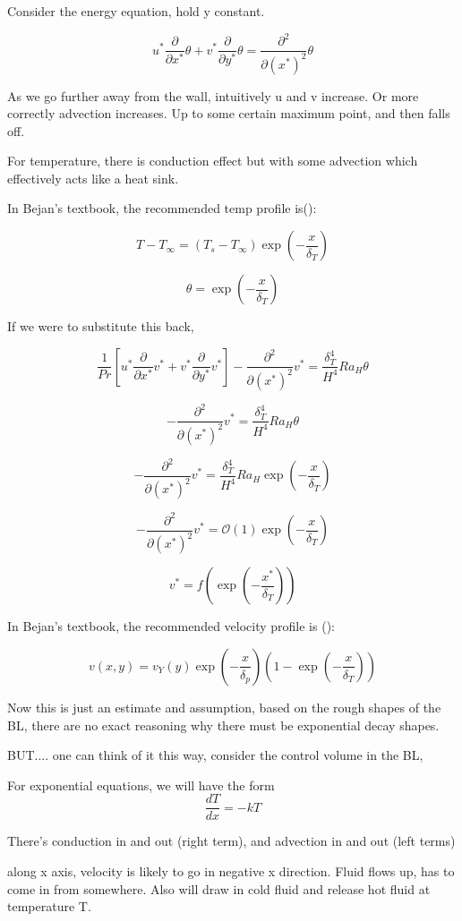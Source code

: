 \documentclass[11pt]{article}
\begin{document}
Consider the energy equation, hold y constant. 

$$ u^* \frac{\partial}{\partial x^*}\theta + v^* \frac{\partial }{\partial y^*}  \theta  = \frac{\partial^2}{\partial (x^*)^2} \theta  $$ 


As we go further away from the wall, intuitively u and v increase. Or more correctly advection increases. Up to some certain maximum point, and then falls off.

For temperature, there is conduction effect but with some advection which effectively acts like a heat sink. 

In Bejan's textbook, the recommended temp profile is(\cite{bejan2013convection}):

$$T-T_\infty = (T_s -T_\infty) \exp (-\frac{x}{\delta_T})$$

$$\theta = \exp (-\frac{x}{\delta_T})$$

If we were to substitute this back,

$$ \frac{1}{Pr} \left[ u^* \frac{\partial}{\partial x^*} v^* +    v^* \frac{\partial}{\partial y^*} v^* \right] -   \frac{\partial^2}{\partial (x^*)^2} v^*  = \frac{\delta_T^4}{ H^4} Ra_H \theta $$

$$-   \frac{\partial^2}{\partial (x^*)^2} v^*  = \frac{\delta_T^4}{ H^4} Ra_H \theta $$

$$-   \frac{\partial^2}{\partial (x^*)^2} v^*  = \frac{\delta_T^4}{ H^4} Ra_H \exp (-\frac{x}{\delta_T}) $$

$$-   \frac{\partial^2}{\partial (x^*)^2} v^*  = \mathcal{O}(1) \exp (-\frac{x}{\delta_T}) $$

$$v^* = f(\exp (-\frac{x^*}{\delta_T}))$$

In Bejan's textbook, the recommended velocity profile is (\cite{bejan2013convection}):


$$v (x,y) = v_Y (y) \exp (-\frac{x}{\delta_p}) (1- \exp (-\frac{x}{\delta_T}))$$

Now this is just an estimate and assumption, based on the rough shapes of the BL, there are no exact reasoning why there must be exponential decay shapes. 

BUT.... one can think of it this way, consider the control volume in the BL,

For exponential equations, we will have the form
$$\frac{dT}{dx} = -kT$$


There's conduction in and out (right term), and advection in and out (left terms)

along x axis, velocity is likely to go in negative x direction. Fluid flows up, has to come in from somewhere. Also will draw in cold fluid and release hot fluid at temperature T.
\end{document}
